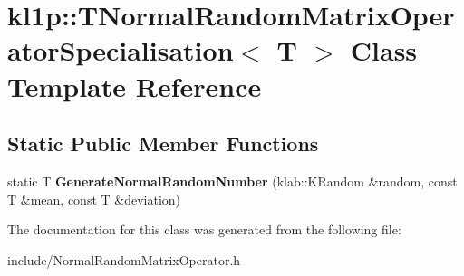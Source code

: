 \hypertarget{classkl1p_1_1TNormalRandomMatrixOperatorSpecialisation}{}\section{kl1p\+:\+:T\+Normal\+Random\+Matrix\+Operator\+Specialisation$<$ T $>$ Class Template Reference}
\label{classkl1p_1_1TNormalRandomMatrixOperatorSpecialisation}
\subsection*{Static Public Member Functions}
\begin{DoxyCompactItemize}
\item 
static T {\bfseries Generate\+Normal\+Random\+Number} (klab\+::\+K\+Random \&random, const T \&mean, const T \&deviation)\hypertarget{classkl1p_1_1TNormalRandomMatrixOperatorSpecialisation_a6f80721722f793f8bcc5228327d33018}{}\label{classkl1p_1_1TNormalRandomMatrixOperatorSpecialisation_a6f80721722f793f8bcc5228327d33018}

\end{DoxyCompactItemize}


The documentation for this class was generated from the following file\+:\begin{DoxyCompactItemize}
\item 
include/Normal\+Random\+Matrix\+Operator.\+h\end{DoxyCompactItemize}
